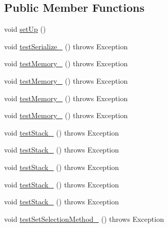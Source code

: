 \subsection*{Public Member Functions}
\begin{DoxyCompactItemize}
\item 
void \hyperlink{classorg_1_1jgap_1_1gp_1_1impl_1_1_g_p_configuration_test_a36558419b94846f60c1573d65c10a88e}{set\-Up} ()
\item 
void \hyperlink{classorg_1_1jgap_1_1gp_1_1impl_1_1_g_p_configuration_test_a739f91c226ae3bed8541bc95ac6bde0c}{test\-Serialize\-\_} ()  throws Exception 
\item 
void \hyperlink{classorg_1_1jgap_1_1gp_1_1impl_1_1_g_p_configuration_test_ae7fcbfc73985a3bceddc4b337990302f}{test\-Memory\-\_} ()  throws Exception 
\item 
void \hyperlink{classorg_1_1jgap_1_1gp_1_1impl_1_1_g_p_configuration_test_af84bf53368bd0142397a3346ac9b0791}{test\-Memory\-\_} ()  throws Exception 
\item 
void \hyperlink{classorg_1_1jgap_1_1gp_1_1impl_1_1_g_p_configuration_test_ade3cb24efcb055c1956e2575c27db7c0}{test\-Memory\-\_} ()  throws Exception 
\item 
void \hyperlink{classorg_1_1jgap_1_1gp_1_1impl_1_1_g_p_configuration_test_af6d914c3b5bd08073b72cd231b7433c7}{test\-Memory\-\_} ()  throws Exception 
\item 
void \hyperlink{classorg_1_1jgap_1_1gp_1_1impl_1_1_g_p_configuration_test_a4ade53b398635cf8f1362f6a2dded2db}{test\-Stack\-\_} ()  throws Exception 
\item 
void \hyperlink{classorg_1_1jgap_1_1gp_1_1impl_1_1_g_p_configuration_test_a0aafb403434058acdbee94dcb04c99e1}{test\-Stack\-\_} ()  throws Exception 
\item 
void \hyperlink{classorg_1_1jgap_1_1gp_1_1impl_1_1_g_p_configuration_test_a9f731c971ec749b99b626f42cf18e0eb}{test\-Stack\-\_} ()  throws Exception 
\item 
void \hyperlink{classorg_1_1jgap_1_1gp_1_1impl_1_1_g_p_configuration_test_a46d07d809b68f60cfe7cc08f6cf664dd}{test\-Stack\-\_} ()  throws Exception 
\item 
void \hyperlink{classorg_1_1jgap_1_1gp_1_1impl_1_1_g_p_configuration_test_a2cf53bda9b5b8a48247157a67c6c8744}{test\-Stack\-\_} ()  throws Exception 
\item 
void \hyperlink{classorg_1_1jgap_1_1gp_1_1impl_1_1_g_p_configuration_test_addd94acf82adb27ac3240fa4f8adffc6}{test\-Set\-Selection\-Method\-\_} ()  throws Exception 

\end{DoxyCompactItemize}
